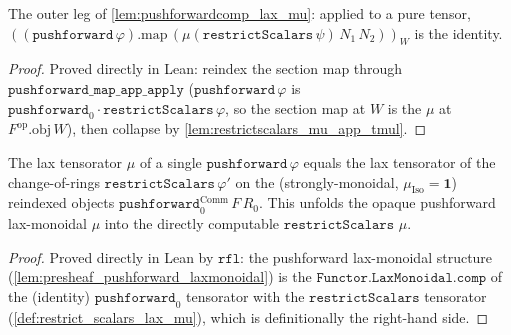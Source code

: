 \begin{lemma}\leanok
  \label{lem:pushforward_map_restrictscalars_mu_app_tmul}
  The outer leg of \cref{lem:pushforwardcomp_lax_mu}: applied to a pure tensor,
  \(((\mathtt{pushforward}\,\varphi).\mathrm{map}\,(\mu(\mathtt{restrictScalars}\,\psi)
  \,N_1\,N_2))_W\) is the identity.
\end{lemma}
\begin{proof}
  \leanok
  Proved directly in Lean: reindex the section map through \(\mathtt{pushforward\_map\_app\_apply}\)
  (\(\mathtt{pushforward}\,\varphi\) is \(\mathtt{pushforward}_0 \cdot \mathtt{restrictScalars}\,\varphi\),
  so the section map at \(W\) is the \(\mu\) at \(F^{\mathrm{op}}.\mathrm{obj}\,W\)), then collapse
  by \cref{lem:restrictscalars_mu_app_tmul}.
\end{proof}

\begin{lemma}\leanok
  \label{lem:pushforward_mu_eq}
  The lax tensorator \(\mu\) of a single \(\mathtt{pushforward}\,\varphi\) equals the lax
  tensorator of the change-of-rings \(\mathtt{restrictScalars}\,\varphi'\) on the
  (strongly-monoidal, \(\mu_{\mathrm{Iso}} = \mathbf{1}\)) reindexed objects
  \(\mathtt{pushforward}_0^{\mathrm{Comm}}\,F\,R_0\). This unfolds the opaque pushforward
  lax-monoidal \(\mu\) into the directly computable \(\mathtt{restrictScalars}\) \(\mu\).
\end{lemma}
\begin{proof}
  \leanok
  Proved directly in Lean by \(\mathtt{rfl}\): the pushforward lax-monoidal structure
  (\cref{lem:presheaf_pushforward_laxmonoidal}) is the \(\mathtt{Functor.LaxMonoidal.comp}\)
  of the (identity) \(\mathtt{pushforward}_0\) tensorator with the
  \(\mathtt{restrictScalars}\) tensorator (\cref{def:restrict_scalars_lax_mu}), which is
  definitionally the right-hand side.
\end{proof}

